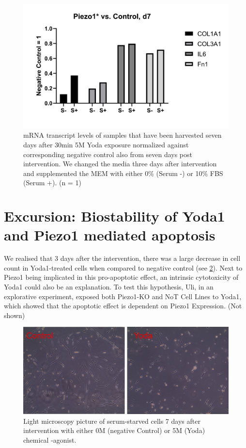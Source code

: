 \begin{figure}
\centering
\includegraphics[width = \linewidth{}]{LongTerm_PCR.png}
\caption{mRNA transcript levels of samples that have been harvested seven days after 30min 5\textmu{}M Yoda exposure normalized against corresponding negative control also from seven days post intervention. We changed the media three days after \Yoda intervention and supplemented the MEM\textalpha{} with either 0\% (Serum -) or 10\% FBS (Serum +). (n = 1)}
\label{fig:LongTerm_PCR}
\end{figure}

\section{Excursion: Biostability of Yoda1 and Piezo1 mediated apoptosis}
\label{sec:biostability}
We realised that 3 days after the intervention, there was a large decrease in cell count in Yoda1-treated cells when compared to negative control (see \ref{pic:Yoda_Apop}). Next to Piezo1 being implicated in this pro-apoptotic effect, an intrinsic cytotoxicity of Yoda1 could also be an explanation. To test this hypothesis, Uli, in an explorative experiment, exposed both Piezo1-KO and NoT Cell Lines to Yoda1, which showed that the apoptotic effect is dependent on Piezo1 Expression. (Not shown)

\begin{figure}
\centering
\includegraphics[width = \linewidth]{Yoda_Apoptosis.png}
\caption{Light microscopy picture of serum-starved cells 7 days after intervention with either 0\textmu{}M (negative Control) or 5\textmu{}M (Yoda) chemical \Piezo{}-agonist.}
\label{pic:Yoda_Apop}
\end{figure}